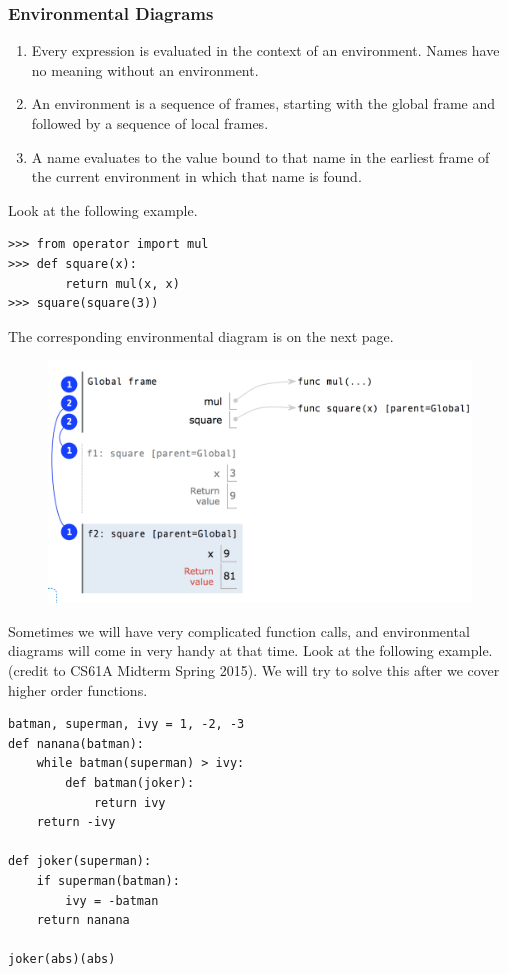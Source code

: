 \documentclass[11pt]{article}
\begin{document}
\subsubsection{Environmental Diagrams} 
\begin{enumerate}
\item Every expression is evaluated in the context of an environment. Names have no meaning without an environment. 
\item An environment is a sequence of frames, starting with the global frame and followed by a sequence of local frames.
\item A name evaluates to the value bound to that name in the earliest frame of the current environment in which that name is found. 
\end{enumerate}
Look at the following example. 
\begin{lstlisting}
>>> from operator import mul
>>> def square(x):
		return mul(x, x)
>>> square(square(3))
\end{lstlisting} 
The corresponding environmental diagram is on the next page. \\
\begin{figure}[h]
\includegraphics[scale=0.7]{Lec3} 
\centering
\end{figure}
\newline
Sometimes we will have very complicated function calls, and environmental diagrams will come in very handy at that time. Look at the following example. (credit to CS61A Midterm Spring 2015). We will try to solve this after we cover higher order functions. 
\begin{lstlisting}
batman, superman, ivy = 1, -2, -3 
def nanana(batman):
	while batman(superman) > ivy: 
		def batman(joker):
			return ivy
	return -ivy

def joker(superman):
	if superman(batman):
		ivy = -batman
	return nanana
	
joker(abs)(abs)
\end{lstlisting}
\end{document}
